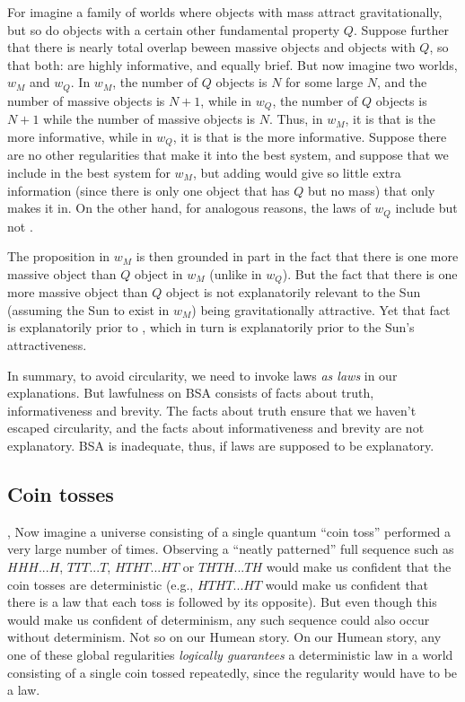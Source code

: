 For imagine a family of worlds where objects with mass attract gravitationally, but so do objects with a certain other 
fundamental property $Q$. 
Suppose further that there is nearly total overlap beween massive objects and objects with $Q$, so that both:
are highly informative, and equally brief. But now imagine two worlds, $w_M$ and $w_Q$. In $w_M$, the number of $Q$
objects is $N$ for some large $N$, and the number of massive objects is $N+1$, while in $w_Q$, the number of $Q$ objects
is $N+1$ while the number of massive objects is $N$. Thus, in $w_M$, it is  that is the more informative,
while in $w_Q$, it is  that is the more informative. Suppose there are no other regularities that make it
into the best system, and suppose that we include  in the best system for $w_M$, but adding 
would give so little extra information (since there is only one object that has $Q$ but no mass) that only  makes 
it in. On the other hand, for analogous reasons, the laws of $w_Q$ include  but not . 

The proposition  in $w_M$ is then grounded in part in the fact that there is one more massive object
than $Q$ object in $w_M$ (unlike in $w_Q$). But the fact that there is one more massive object than $Q$ object is 
not explanatorily relevant to the Sun (assuming the Sun to exist in $w_M$) being gravitationally attractive. 
Yet that fact is explanatorily prior to , which in turn is explanatorily prior to the Sun's attractiveness.

In summary, to avoid circularity, we need to invoke laws \textit{as laws} in our explanations. But lawfulness on BSA consists
of facts about truth, informativeness and brevity. The facts about truth ensure that we haven't escaped circularity, and the
facts about informativeness and brevity are not explanatory. BSA is inadequate, thus, if laws are supposed to be explanatory.

\subsection{Coin tosses},
Now imagine a universe consisting of a single quantum ``coin toss'' performed a very large number of times. Observing 
a ``neatly patterned'' full sequence such as $HHH...H$, $TTT...T$, $HTHT...HT$ or $THTH...TH$ would make us confident 
that the coin tosses are deterministic (e.g., $HTHT...HT$
would make us confident that there is a law that each toss is followed by its opposite). But even though this would make us confident of determinism, any such sequence could also
occur without determinism. Not so on our Humean story. On our Humean story, any one of these global regularities \textit{logically 
guarantees} a deterministic law in a world consisting of a single coin tossed repeatedly, since the regularity would
have to be a law. 

